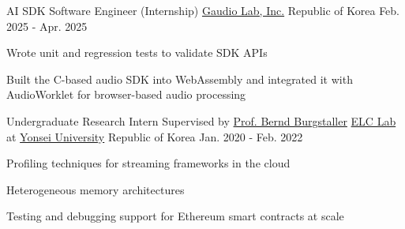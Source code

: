 

\begin{cventries}

  \cventry
    {AI SDK Software Engineer (Internship)} %
    {\href{https://www.gaudiolab.com}{Gaudio Lab, Inc.}} %
    {Republic of Korea} %
    {Feb. 2025 - Apr. 2025} %
    {
      \begin{cvitems} %
        \item {Wrote unit and regression tests to validate SDK APIs}
        \item {Built the C-based audio SDK into WebAssembly and integrated it with AudioWorklet for browser-based audio processing}
      \end{cvitems}
    }


  \cventry
    {Undergraduate Research Intern Supervised by \href{https://cs.yonsei.ac.kr/bbs/board.php?bo_table=sub2_1_a&wr_id=18}{Prof. Bernd Burgstaller}} %
    {\href{https://elc.yonsei.ac.kr}{ELC Lab} at \href{https://www.yonsei.ac.kr/sc/index.jsp}{Yonsei University}} %
    {Republic of Korea} %
    {Jan. 2020 - Feb. 2022} %
    {
      \begin{cvitems} %
        \item {Profiling techniques for streaming frameworks in the cloud}
        \item {Heterogeneous memory architectures}
        \item {Testing and debugging support for Ethereum smart contracts at scale}
      \end{cvitems}
    }

\end{cventries}
